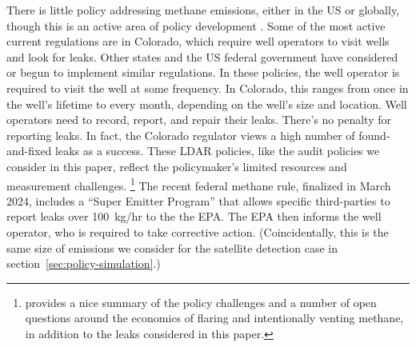 There is little policy addressing methane emissions, either in the US or globally, though this is an active area of policy development
\parencite{EPA-methane-rule-2024}.
Some of the most active current regulations are in Colorado, which require well operators to visit wells and look for leaks.
Other states and the US federal government have considered or begun to implement similar regulations.
In these policies, the well operator is required to visit the well at some frequency.
In Colorado, this ranges from once in the well's lifetime to every month, depending on the well's size and location.
Well operators need to record, report, and repair  their leaks.
There's no penalty for reporting leaks.
In fact, the Colorado regulator views a high number of found-and-fixed leaks as a success.
These \gls{LDAR} policies, like the audit policies we consider in this paper, reflect the policymaker's limited resources and measurement challenges.%
\footnote{%
\textcite{Agerton/Gilbert/Upton:2023} provides a nice summary of the policy challenges and a number of open questions around the economics of flaring and intentionally venting methane, in addition to the leaks considered in this paper.
}
The recent federal methane rule, finalized in March 2024, includes a ``Super Emitter Program'' that allows specific third-parties to report leaks over 100~kg/hr to the the \gls{EPA}.
The \gls{EPA} then informs the well operator, who is required to take corrective action.
(Coincidentally, this is the same size of emissions we consider for the satellite detection case in section~\ref{sec:policy-simulation}.)

